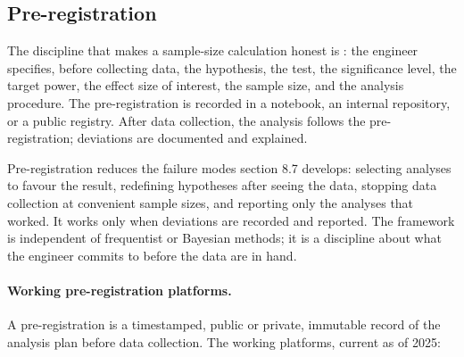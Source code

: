 \subsection{Pre-registration}

The discipline that makes a sample-size calculation honest is
: the engineer specifies, before collecting
data, the hypothesis, the test, the significance level, the target
power, the effect size of interest, the sample size, and the analysis
procedure. The pre-registration is recorded in a notebook, an
internal repository, or a public registry. After data collection,
the analysis follows the pre-registration; deviations are documented
and explained.

Pre-registration reduces the failure modes section 8.7 develops:
selecting analyses to favour the result, redefining hypotheses after
seeing the data, stopping data collection at convenient sample sizes,
and reporting only the analyses that worked. It works only when
deviations are recorded and reported. The framework is independent
of frequentist or Bayesian methods; it is a discipline about what
the engineer commits to before the data are in hand.

\paragraph{Working pre-registration platforms.}
A pre-registration is a timestamped, public or private, immutable
record of the analysis plan before data collection. The working
platforms, current as of 2025:

